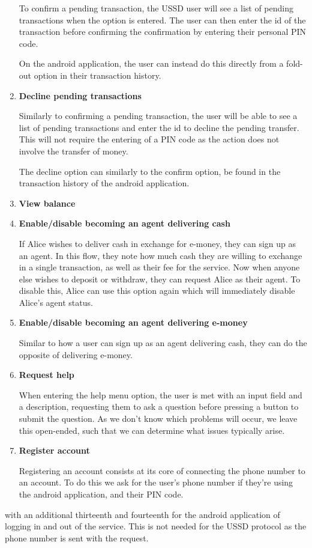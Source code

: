 \documentclass[11pt, a4paper]{article}
\begin{document}
\begin{enumerate}
  To confirm a pending transaction, the USSD user will see a list of pending transactions when the option is entered. The user can then enter the id of the transaction before confirming the confirmation by entering their personal PIN code.

  On the android application, the user can instead do this directly from a fold-out option in their transaction history.
  \item \textbf{Decline pending transactions}

  Similarly to confirming a pending transaction, the user will be able to see a list of pending transactions and enter the id to decline the pending transfer. This will not require the entering of a PIN code as the action does not involve the transfer of money.

  The decline option can similarly to the confirm option, be found in the transaction history of the android application.

  \item \textbf{View balance}

  \item \textbf{Enable/disable becoming an agent delivering cash}

  If Alice wishes to deliver cash in exchange for e-money, they can sign up as an agent. In this flow, they note how much cash they are willing to exchange in a single transaction, as well as their fee for the service. Now when anyone else wishes to deposit or withdraw, they can request Alice as their agent. To disable this, Alice can use this option again which will immediately disable Alice's agent status.
  \item \textbf{Enable/disable becoming an agent delivering e-money}

  Similar to how a user can sign up as an agent delivering cash, they can do the opposite of delivering e-money.
  \item \textbf{Request help}

  When entering the help menu option, the user is met with an input field and a description, requesting them to ask a question before pressing a button to submit the question. As we don't know which problems will occur, we leave this open-ended, such that we can determine what issues typically arise.
  \item \textbf{Register account}

  Registering an account consists at its core of connecting the phone number to an account. To do this we ask for the user's phone number if they're using the android application, and their PIN code.
\end{enumerate}
with an additional thirteenth and fourteenth for the android application of logging in and out of the service. This is not needed for the USSD protocol as the phone number is sent with the request.
\end{document}

